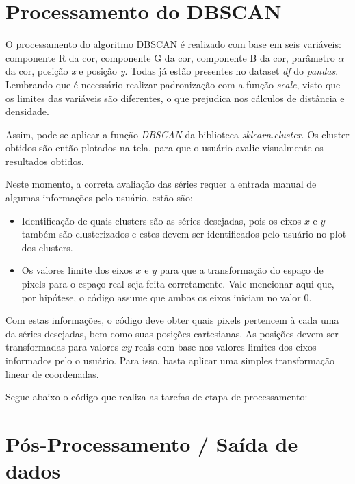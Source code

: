 \documentclass{article}
\begin{document}
    
    
    
    \section{Processamento do DBSCAN}
    
    O processamento do algoritmo DBSCAN é realizado com base em seis variáveis: componente R da cor, componente G da cor, componente B da cor, parâmetro $\alpha$ da cor, posição \textit{x} e posição \textit{y}. Todas já estão presentes no dataset \textit{df} do \textit{pandas}. Lembrando que é necessário realizar padronização com a função \textit{scale}, visto que os limites das variáveis são diferentes, o que prejudica nos cálculos de distância e densidade.
    
    Assim, pode-se aplicar a função \textit{DBSCAN} da biblioteca \textit{sklearn.cluster}. Os cluster obtidos são então plotados na tela, para que o usuário avalie visualmente os resultados obtidos.
    
    Neste momento, a correta avaliação das séries requer a entrada manual de algumas informações pelo usuário, estão são:
    
    \begin{itemize}
        \item Identificação de quais clusters são as séries desejadas, pois os eixos $x$ e $y$ também são clusterizados e estes devem ser identificados pelo usuário no plot dos clusters.
        
        \item Os valores limite dos eixos $x$ e $y$ para que a transformação do espaço de pixels para o espaço real seja feita corretamente. Vale mencionar aqui que, por hipótese, o código assume que ambos os eixos iniciam no valor $0$.
    \end{itemize}
    
    Com estas informações, o código deve obter quais pixels pertencem à cada uma da séries desejadas, bem como suas posições cartesianas. As posições devem ser transformadas para valores $xy$ reais com base nos valores limites dos eixos informados pelo o usuário. Para isso, basta aplicar uma simples transformação linear de coordenadas.
    
    Segue abaixo o código que realiza as tarefas de etapa de processamento:
    
    
    
    
    \section{Pós-Processamento / Saída de dados}
    
\end{document}
